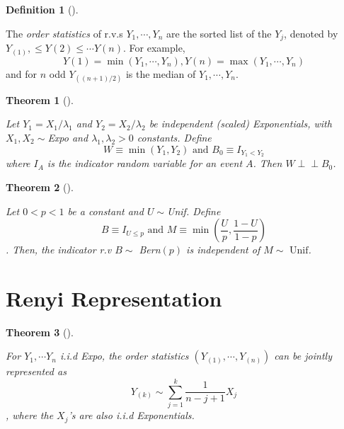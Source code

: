 \documentclass[
  letterpaper,
  DIV=11,
  numbers=noendperiod]{scrreprt}
\theoremstyle{plain}
\newtheorem{theorem}{Theorem}[chapter]
\theoremstyle{definition}
\newtheorem{definition}{Definition}[chapter]
\theoremstyle{remark}
\begin{document}

\leavevmode{}%
\begin{definition}[]\label{def-poisson-process}

The \emph{order statistics} of r.v.s \(Y_1, \cdots, Y_n\) are the sorted
list of the \(Y_j\), denoted by
\(Y_{(1)}, \leq Y{(2)} \leq \cdots Y{(n)}\). For example,
\[Y{(1)} =\min(Y_1,\cdots, Y_n), Y{(n)}=\max(Y_1,\cdots, Y_n)\] and for
\(n\) odd \(Y_{((n+1)/2)}\) is the median of \(Y_1,\cdots, Y_n\).

\end{definition}

\leavevmode{}%
\begin{theorem}[]\label{thm-competing-risk}

Let \(Y_1 = X_1/\lambda_1\) and \(Y_2 = X_2/\lambda_2\) be independent
(scaled) Exponentials, with \(X_1,X_2 \sim\)Expo and
\(\lambda_1, \lambda_2 >0\) constants. Define
\[W\equiv\min(Y_1, Y_2) \text{ and } B_0\equiv I_{Y_1<Y_2}\] where
\(I_A\) is the indicator random variable for an event \(A\). Then
\(W \perp\!\!\!\perp B_0\).

\end{theorem}

\leavevmode{}%
\begin{theorem}[]\label{thm-lemma}

Let \(0<p<1\) be a constant and \(U\sim\)Unif. Define
\[B\equiv I_{U\leq p} \text{ and } M\equiv \min(\frac{U}{p}, \frac{1-U}{1-p})\].
Then, the indicator r.v \(B\sim\) Bern\((p)\) is independent of
\(M \sim \text{ Unif}\).

\end{theorem}

\hypertarget{renyi-representation}{%
\section*{Renyi Representation}\label{renyi-representation}}


\leavevmode{}%
\begin{theorem}[]\label{thm-renyi-representation}

For \(Y_1,\cdots Y_n\) i.i.d Expo, the \emph{order statistics}
\((Y_{(1)},\cdots, Y_{(n)})\) can be jointly represented as
\[Y_{(k)}\sim \sum_{j=1}^k \frac{1}{n-j+1} X_j\], where the \(X_j\)'s
are also i.i.d Exponentials.

\end{theorem}
\end{document}
